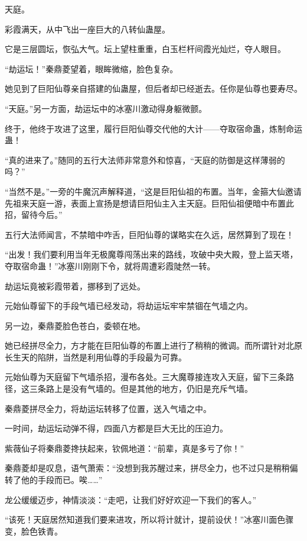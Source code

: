 
\begin{this_body}

天庭。

彩霞满天，从中飞出一座巨大的八转仙蛊屋。

它是三层圆坛，恢弘大气。坛上望柱重重，白玉栏杆间霞光灿烂，夺人眼目。

“劫运坛！”秦鼎菱望着，眼眸微缩，脸色复杂。

她见到了巨阳仙尊亲自搭建的仙蛊屋，但后者却已经逝去。任你是仙尊也要寿尽。

“天庭。”另一方面，劫运坛中的冰塞川激动得身躯微颤。

终于，他终于攻进了这里，履行巨阳仙尊交代他的大计——夺取宿命蛊，炼制命运蛊！

“真的进来了。”随同的五行大法师非常意外和惊喜，“天庭的防御是这样薄弱的吗？”

“当然不是。”一旁的牛魔沉声解释道，“这是巨阳仙祖的布置。当年，金箍大仙邀请先祖来天庭一游，表面上宣扬是想请巨阳仙主入主天庭。巨阳仙祖便暗中布置此招，留待今后。”

五行大法师闻言，不禁暗中咋舌，巨阳仙尊的谋略实在久远，居然算到了现在！

“出发！我们要利用当年无极魔尊闯荡出来的路线，攻破中央大殿，登上监天塔，夺取宿命蛊！”冰塞川刚刚下令，就将周遭彩霞陡然一转。

劫运坛竟被彩霞带着，挪移到了远处。

元始仙尊留下的手段气墙已经发动，将劫运坛牢牢禁锢在气墙之内。

另一边，秦鼎菱脸色苍白，委顿在地。

她已经拼尽全力，方才能在巨阳仙尊的布置上进行了稍稍的微调。而所谓针对北原长生天的陷阱，当然是利用仙尊的手段最为可靠。

元始仙尊为天庭留下气墙杀招，漫布各处。三大魔尊接连攻入天庭，留下三条路径，这三条路上是没有气墙的。但是其他的地方，仍旧是充斥气墙。

秦鼎菱拼尽全力，将劫运坛转移了位置，送入气墙之中。

一时间，劫运坛动弹不得，四面八方都是巨大无比的压迫力。

紫薇仙子将秦鼎菱搀扶起来，钦佩地道：“前辈，真是多亏了你！”

秦鼎菱却是叹息，语气萧索：“没想到我苏醒过来，拼尽全力，也不过只是稍稍偏转了他的手段而已。唉……”

龙公缓缓迈步，神情淡淡：“走吧，让我们好好欢迎一下我们的客人。”

“该死！天庭居然知道我们要来进攻，所以将计就计，提前设伏！”冰塞川面色骤变，脸色铁青。


\end{this_body}
